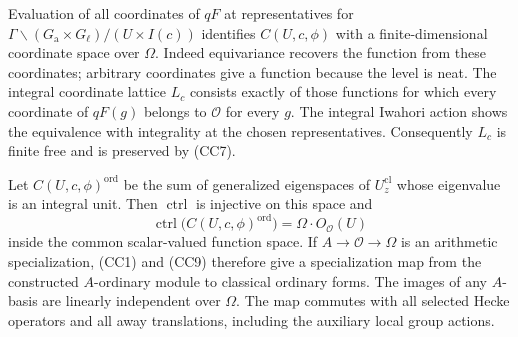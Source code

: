 Evaluation of all coordinates of \(qF\) at representatives for
\(\Gamma\backslash(G_{\mathrm a}\times G_\ell)/(U\times I(c))\)
identifies \(C(U,c,\phi)\) with a finite-dimensional coordinate
space over \(\Omega\).
Indeed equivariance recovers the function from these coordinates;
arbitrary coordinates give a function because the level is neat.
The integral coordinate lattice \(L_c\) consists exactly of those
functions for which every coordinate of \(qF(g)\) belongs to
\(\mathcal O\) for every \(g\).
The integral Iwahori action shows the equivalence with integrality
at the chosen representatives.
Consequently \(L_c\) is finite free and is preserved by (CC7).

\begin{srproposition}
\label{prop:classical-ordinary-control}
Let \(C(U,c,\phi)^{\mathrm{ord}}\) be the sum of generalized
eigenspaces of \(U_z^{\mathrm{cl}}\) whose eigenvalue is an integral
unit.  Then \(\operatorname{ctrl}\) is injective on this space and
\[
 \operatorname{ctrl}\bigl(C(U,c,\phi)^{\mathrm{ord}}\bigr)
  =\Omega\cdot O_{\mathcal O}(U)
 \tag{CC9}
\]
inside the common scalar-valued function space.
If \(A\to\mathcal O\to\Omega\) is an arithmetic specialization,
(CC1) and (CC9) therefore give a specialization map from the
constructed \(A\)-ordinary module to classical ordinary forms.
The images of any \(A\)-basis are linearly independent over
\(\Omega\).
The map commutes with all selected Hecke operators and all away
translations, including the auxiliary local group actions.
\end{srproposition}

